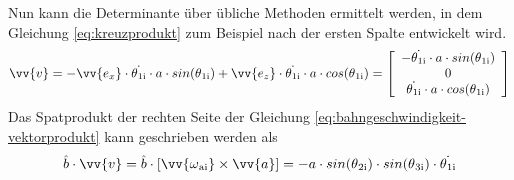 \documentclass[Bachelor, BMR, ngerman]{twbook}
\begin{document}
    \noindent
    Nun kann die Determinante über übliche Methoden ermittelt werden, in dem Gleichung \ref{eq:kreuzprodukt} zum Beispiel nach der ersten Spalte entwickelt wird.
    \newline
    \begin{align}
        \vv{v} =
        - \vv{e_x} \cdot \dot{\theta\textsubscript{1i}} \cdot a \cdot sin(\theta\textsubscript{1i}) + \vv{e_z} \cdot \dot{\theta\textsubscript{1i}} \cdot a \cdot cos(\theta\textsubscript{1i}) = 
        \left[
            \begin{array}{c} 
                - \dot{\theta\textsubscript{1i}} \cdot a \cdot sin(\theta\textsubscript{1i})\\
                0\\
                \dot{\theta\textsubscript{1i}} \cdot a \cdot cos(\theta\textsubscript{1i})
            \end{array}
        \right]
        \label{eq:determinante}
    \end{align}
    \noindent
    Das Spatprodukt der rechten Seite der Gleichung \ref{eq:bahngeschwindigkeit-vektorprodukt} kann geschrieben werden als
    \newline
    \begin{align}
        \hat{b} \cdot \vv{v} = \hat{b} \cdot 
        \left[
            \vv{\omega\textsubscript{ai}} \times \vv{a}
        \right] = -a \cdot sin(\theta\textsubscript{2i}) \cdot sin(\theta\textsubscript{3i}) \cdot \dot{\theta\textsubscript{1i}}
        \label{eq:spatprodukt}
    \end{align}
    \noindent
\end{document}
